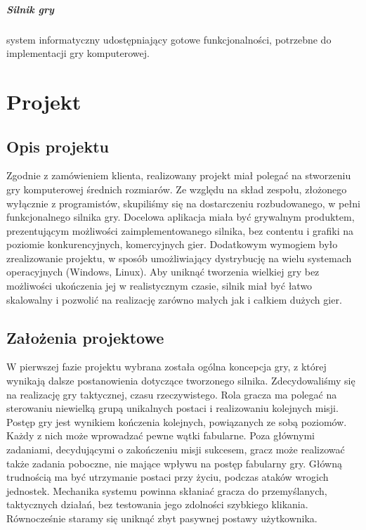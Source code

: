 \documentclass[licencjacka]{pracamgr}
\begin{document}
  \paragraph{Silnik gry} system informatyczny udostępniający gotowe funkcjonalności, potrzebne do implementacji gry komputerowej.

\chapter{Projekt}

  \section{Opis projektu}
  Zgodnie z zamówieniem klienta, realizowany projekt miał polegać na stworzeniu gry komputerowej
  średnich rozmiarów. Ze względu na skład zespołu, złożonego wyłącznie z programistów, skupiliśmy się
  na dostarczeniu rozbudowanego, w pełni funkcjonalnego silnika gry.
  Docelowa aplikacja miała być grywalnym produktem, prezentującym możliwości zaimplementowanego silnika,
  bez contentu i grafiki na poziomie konkurencyjnych, komercyjnych gier. Dodatkowym wymogiem było zrealizowanie
  projektu, w sposób umożliwiający dystrybucję na wielu systemach operacyjnych (Windows, Linux). Aby uniknąć
  tworzenia wielkiej gry bez możliwości ukończenia jej w realistycznym czasie, silnik miał być łatwo skalowalny
  i pozwolić na realizację zarówno małych jak i całkiem dużych gier.

  \section{Założenia projektowe}
  W pierwszej fazie projektu wybrana została ogólna koncepcja gry, z której wynikają dalsze postanowienia dotyczące
  tworzonego silnika. Zdecydowaliśmy się na realizację gry taktycznej, czasu rzeczywistego. Rola gracza ma polegać
  na sterowaniu niewielką grupą unikalnych postaci i realizowaniu kolejnych misji. Postęp gry jest wynikiem kończenia
  kolejnych, powiązanych ze sobą poziomów. Każdy z nich może wprowadzać pewne wątki fabularne. Poza głównymi zadaniami,
  decydującymi o zakończeniu misji sukcesem, gracz może realizować także zadania poboczne, nie mające wpływu na
  postęp fabularny gry. Główną trudnością ma być utrzymanie postaci przy życiu, podczas ataków wrogich jednostek.
  Mechanika systemu powinna skłaniać gracza do przemyślanych, taktycznych działań, bez testowania jego zdolności
  szybkiego klikania. Równocześnie staramy się uniknąć zbyt pasywnej postawy użytkownika.
\end{document}
